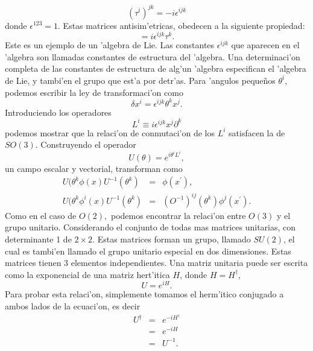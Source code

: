 \begin{equation}
(\tau^i)^{jk}=-i\epsilon^{ijk}
\end{equation}
donde $\epsilon^{123}=1$. Estas matrices antisim'etricas, obedecen a la siguiente propiedad:
\begin{equation}
[\tau^i,\tau^j]=i\epsilon^{ijk}\tau^k. \label{algebraso3}
\end{equation}
Este es un ejemplo de un 'algebra de Lie. Las constantes $\epsilon^{ijk}$ que aparecen en el 'algebra son llamadas constantes de estructura del 'algebra. Una determinaci'on completa de las constantes de estructura de alg'un 'algebra  especifican el 'algebra de Lie, y tambi'en el grupo que est'a por detr'as.
Para 'angulos peque\~nos $\theta^i$, podemos escribir la ley de transformaci'on como
\begin{equation}
\delta x^i=\epsilon^{ijk}\theta^k x^j.
\end{equation}
Introduciendo los operadores
\begin{equation}
L^i\equiv i\epsilon^{ijk} x^j \partial^k
\end{equation}
podemos mostrar que la relaci'on de conmutaci'on de los $L^i$ satisfacen la de $SO(3)$. Construyendo el operador
\begin{equation}
U(\theta)=e^{i\theta^i L^i},
\end{equation}
un campo escalar y vectorial, transforman como
\begin{equation}
\begin{aligned}
U(\theta^k \phi(x)U^{-1}(\theta^k)&=&\phi(x^\prime), \\
U(\theta^k \phi^i(x)U^{-1}(\theta^k)&=&\left(O^{-1}\right)^{ij}(\theta^k)\phi^j(x^\prime).
\end{aligned}
\end{equation}
Como en el caso de $O(2),$ podemos encontrar la relaci'on entre $O(3)$ y el grupo unitario. Considerando el conjunto de todas mas matrices unitarias, con determinante 1 de $2\times 2$. Estas matrices forman un grupo, llamado $SU(2)$, el cual es tambi'en llamado el grupo unitario especial en dos dimensiones. Estas matrices tienen 3 elementos independientes. Una matriz unitaria puede ser escrita como la exponencial de una matriz hert'itica $H$, donde $H=H^\dagger$,
\begin{equation}
U=e^{iH}.
\end{equation}
Para probar esta relaci'on, simplemente tomamos el herm'itico conjugado a ambos lados de la ecuaci'on, es decir
\begin{equation}
\begin{aligned}
U^{\dagger}&=&e^{-iH^{\dagger}} \\
&=&e^{-iH} \\
&=&U^{-1}.
\end{aligned}
\end{equation}
